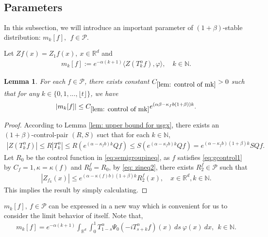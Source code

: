 \documentclass[12pt,oneside,english]{amsart}
\theoremstyle{plain}
\newtheorem{lem}[thm]{Lemma}
\theoremstyle{definition}
\numberwithin{equation}{section}
\newcommand{\added}[1]{{\color{blue}#1}}\newcommand{\deleted}[1]{{\color{red}#1}}
\begin{document}
\subsection{Parameters}
\added{
 In this subsection, we will introduce an important parameter of $(1+\beta)$-stable distribution: $m_k[f],~~f\in \mathcal{P}$. 
 
 Let $Zf(x)=Z_1f(x),~x\in\mathbb{R}^d$ and 
 \begin{align}\label{parameter_mk}
      m_k[f]:=e^{-\alpha(k+1)}\langle Z(T_k^{\alpha}f),\varphi\rangle,\quad k\in \mathbb{N}.
 \end{align}
 }
\begin{lem}\label{lem: control of mk}
For each $f\in\mathcal{P}$, there exists constant $C_{\ref{lem: control of mk}}>0$ such that for any $k\in \{0,1,...,\lfloor t\rfloor\}$, we have
$$|m_k[f]|\leq C_{\ref{lem: control of mk}} e^{(\alpha\beta-\kappa_fb(1+\beta))k}.$$
\end{lem}
\begin{proof}
\added{
According to Lemma \ref{lem: upper bound for usgx}, there exists an $(1+\beta)$-control-pair $(R,S)$ suct that for each $k\in\mathbb{N}$,
\begin{align}
    |Z(T^{\alpha}_k f)|\leq R|T^{\alpha}_k|\leq R (e^{(\alpha-\kappa_fb)k}Qf)\leq S(e^{(\alpha-\kappa_fb)k}Qf)=e^{(\alpha-\kappa_fb)(1+\beta)k}SQf.
    \end{align}
}
\deleted{
Let $R_0$ be the control function in \eqref{eq:semigroupineq}, as $f$ satisfies \eqref{eq:gcontrol1} by $C_f=1, \kappa=\kappa(f)$ and $R_0^f=R_0$, by \eqref{eq: zineq2}, there exists $R_2^f\in \mathcal{P}$ such that
\begin{align}
    |Z_{f_k}(x)|\leq e^{(\alpha-\kappa(f)b)(1+\beta)k}R_2^f(x), \quad x\in \mathbb{R}^d, k\in\mathbb{N}.
\end{align}
}
This implies the result by simply calculating.
\end{proof}

$m_k[f],~f\in \mathcal{P}$ can be expressed in a new way which is convenient for us to consider the limit behavior of itself. Note that,
\begin{align}
    m_k[f]=e^{-\alpha(k+1)}\int_{\mathbb{R}^d}\int_0^1 T_{1-s}^{\alpha}\Psi_0(-iT_{s+k}^{\alpha}f)(x)~ds~\varphi(x)~dx,~~k\in\mathbb{N}.
\end{align}
\end{document}
